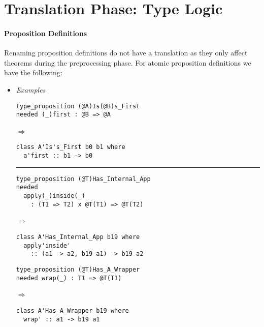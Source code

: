 \documentclass[diploma]{softlab-thesis}
\def\lra{$\Longrightarrow$\ }
\begin{document}
\newpage
\section{Translation Phase: Type Logic}

\paragraph{Proposition Definitions}

Renaming proposition definitions do not have a translation as they only
affect theorems during the preprocessing phase. For atomic proposition
definitions we have the following:

\begin{itemize}

\item
\textit{Examples}\\

\begin{minipage}{0.45\linewidth}
\begin{verbatim}
type_proposition (@A)Is(@B)s_First
needed (_)first : @B => @A
\end{verbatim}

\lra

\begin{verbatim}
class A'Is's_First b0 b1 where
  a'first :: b1 -> b0
\end{verbatim}

\rule{\linewidth}{0.1pt}

\begin{verbatim}
type_proposition (@T)Has_Internal_App
needed
  apply(_)inside(_)
    : (T1 => T2) x @T(T1) => @T(T2)
\end{verbatim}

\lra

\begin{verbatim}
class A'Has_Internal_App b19 where
  apply'inside'
    :: (a1 -> a2, b19 a1) -> b19 a2
\end{verbatim}
\end{minipage}
\hfill\vline\hfill
\begin{minipage}{0.40\linewidth}
\begin{verbatim}
type_proposition (@T)Has_A_Wrapper
needed wrap(_) : T1 => @T(T1)
\end{verbatim}

\lra

\begin{verbatim}
class A'Has_A_Wrapper b19 where
  wrap' :: a1 -> b19 a1
\end{verbatim}


\end{minipage}
\end{itemize}
\end{document}
